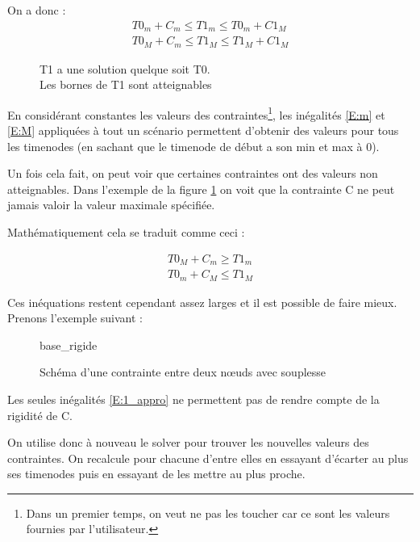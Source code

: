 \documentclass[10pt,a4paper]{article}
\begin{document}
On a donc : 
	\begin{eqnarray}
		\label{E:m}
		T0_m + C_m \leq T1_m \leq T0_m + C1_M \\
		T0_M + C_m \leq T1_M \leq T1_M + C1_M
		\label{E:M}
	\end{eqnarray}


	
	\begin{figure}[h]
		\centering
		\hspace{0.1\textwidth}
		\caption{T1 a une solution quelque soit T0. \\ Les bornes de T1 sont atteignables}
		\label{S:large_cstr}
	\end{figure}


En considérant constantes les valeurs des contraintes\footnote{Dans un premier temps, on veut ne pas les toucher car ce sont les valeurs fournies par l'utilisateur.}, les inégalités \eqref{E:m} et \eqref{E:M} appliquées à tout un scénario permettent d'obtenir des valeurs pour tous les timenodes (en sachant que le timenode de début a son min et max à 0).

Un fois cela fait, on peut voir que certaines contraintes ont des valeurs non atteignables. Dans l'exemple de la figure \ref{S:large_cstr} on voit que la contrainte C ne peut jamais valoir la valeur maximale spécifiée.

Mathématiquement cela se traduit comme ceci :

	\begin{eqnarray}
		\label{E:1_appro}
		T0_M + C_m \geq T1_m \\
		T0_m + C_M \leq T1_M \nonumber
	\end{eqnarray}

Ces inéquations restent cependant assez larges et il est possible de faire mieux. Prenons l'exemple suivant : 
	\begin{figure}[h]
		\centering
		
		\schemaScenario base_rigide
		\caption{Schéma d'une contrainte entre deux nœuds avec souplesse}
		\label{S:base_rigid}
	\end{figure}

Les seules inégalités \eqref{E:1_appro} ne permettent pas de rendre compte de la rigidité de C.

On utilise donc à nouveau le solver pour trouver les nouvelles valeurs des contraintes. On recalcule pour chacune d'entre elles en essayant d'écarter au plus ses timenodes puis en essayant de les mettre au plus proche.
\end{document}
